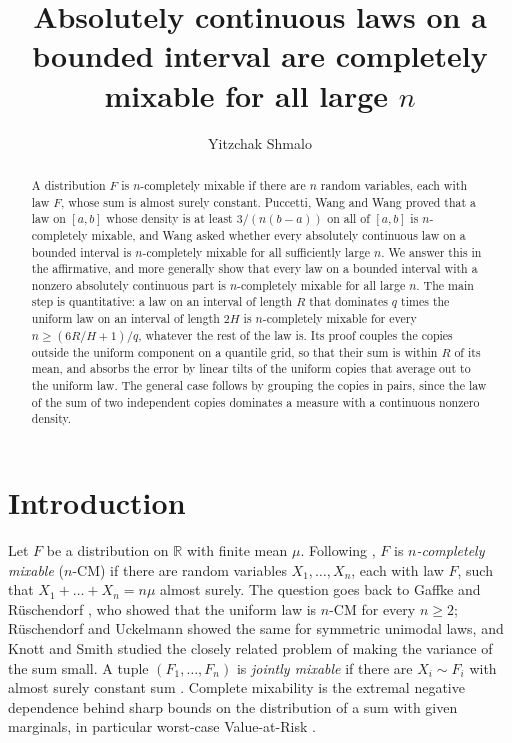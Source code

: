 ﻿\documentclass[11pt]{amsart}
\makeatletter
\newcommand{\AUTHORNAME}{Yitzchak Shmalo}
\newcommand{\AFFILIATION}{Einstein Institute of Mathematics, The Hebrew University of Jerusalem, Jerusalem, Israel}
\newcommand{\AUTHOREMAIL}{yitzchak.shmalo@gmail.com}
\theoremstyle{remark}
\makeatother
\begin{document}
\title[Complete mixability for large $n$]{Absolutely continuous laws on a bounded interval are completely mixable for all large $n$}

\author{\AUTHORNAME}
\address{\AFFILIATION}
\email{\AUTHOREMAIL}


\begin{abstract}
A distribution $F$ is $n$-completely mixable if there are $n$ random variables, each with law $F$, whose sum is almost surely constant. Puccetti, Wang and Wang proved that a law on $[a,b]$ whose density is at least $3/(n(b-a))$ on all of $[a,b]$ is $n$-completely mixable, and Wang asked whether every absolutely continuous law on a bounded interval is $n$-completely mixable for all sufficiently large $n$. We answer this in the affirmative, and more generally show that every law on a bounded interval with a nonzero absolutely continuous part is $n$-completely mixable for all large $n$. The main step is quantitative: a law on an interval of length $R$ that dominates $q$ times the uniform law on an interval of length $2H$ is $n$-completely mixable for every $n\ge(6R/H+1)/q$, whatever the rest of the law is. Its proof couples the copies outside the uniform component on a quantile grid, so that their sum is within $R$ of its mean, and absorbs the error by linear tilts of the uniform copies that average out to the uniform law. The general case follows by grouping the copies in pairs, since the law of the sum of two independent copies dominates a measure with a continuous nonzero density.
\end{abstract}

\maketitle

\section{Introduction}

Let $F$ be a distribution on $\mathbb R$ with finite mean $\mu$. Following \cite{WW11,PWW12}, $F$ is \emph{$n$-completely mixable} ($n$-CM) if there are random variables $X_1,\dots,X_n$, each with law $F$, such that $X_1+\dots+X_n=n\mu$ almost surely. The question goes back to Gaffke and R\"uschendorf \cite{GR81}, who showed that the uniform law is $n$-CM for every $n\ge2$; R\"uschendorf and Uckelmann \cite{RU02} showed the same for symmetric unimodal laws, and Knott and Smith \cite{KS06} studied the closely related problem of making the variance of the sum small. A tuple $(F_1,\dots,F_n)$ is \emph{jointly mixable} if there are $X_i\sim F_i$ with almost surely constant sum \cite{WW16}. Complete mixability is the extremal negative dependence behind sharp bounds on the distribution of a sum with given marginals, in particular worst-case Value-at-Risk \cite{WW11,PWW12,Wang15,EPR13}.
\end{document}
